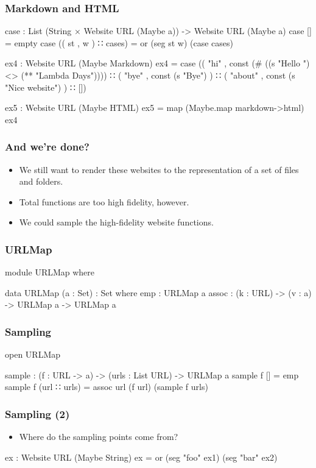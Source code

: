 \documentclass[aspectratio=169]{beamer}
\begin{document}
\begin{frame}
\frametitle{Markdown and HTML}
\begin{code}
  case : List (String × Website URL (Maybe a)) -> Website URL (Maybe a)
  case [] = empty
  case (( st , w ) ∷ cases) = or (seg st w) (case cases)
  
  ex4 : Website URL (Maybe Markdown)
  ex4 = case (( "hi" , const (# ((s "Hello ") <> (** "Lambda Days")))) ∷
              ( "bye" , const (s "Bye") ) ∷
              ( "about" , const (s "Nice website") ) ∷
              [])
  
  ex5 : Website URL (Maybe HTML)
  ex5 = map (Maybe.map markdown->html) ex4
\end{code}
\end{frame}

\begin{frame}
\frametitle{And we're done?}
\begin{itemize}
 \item We still want to render these websites to the representation of a set of files and folders.
 \item Total functions are too high fidelity, however.
 \item We could sample the high-fidelity website functions.
\end{itemize}
\end{frame}

\begin{frame}
\frametitle{URLMap}
\begin{code}
  module URLMap where
  
    data URLMap (a : Set) : Set where
      emp : URLMap a
      assoc : (k : URL) -> (v : a) -> URLMap a -> URLMap a
\end{code}
\end{frame}

\begin{frame}
\frametitle{Sampling}
\begin{code}
  open URLMap

  sample : (f : URL -> a) -> (urls : List URL) -> URLMap a
  sample f [] = emp
  sample f (url ∷ urls) = assoc url (f url) (sample f urls)
\end{code}
\end{frame}

\begin{frame}
\frametitle{Sampling (2)}
\begin{itemize}
  \item Where do the sampling points come from?
\end{itemize}
\begin{code}
  ex : Website URL (Maybe String)
  ex = or (seg "foo" ex1)
          (seg "bar" ex2)
\end{code}
\end{frame}
\end{document}
